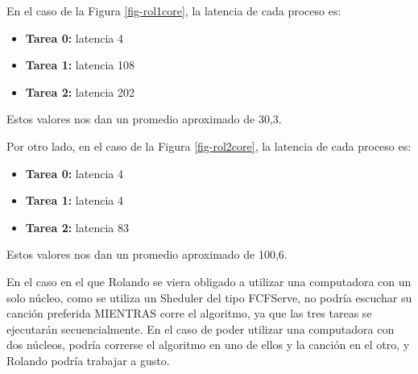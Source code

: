 En el caso de la Figura \ref{fig-rol1core}, la latencia de cada proceso es:

\begin{itemize}
	\item {\bf Tarea 0:} latencia 4
	\item {\bf Tarea 1:} latencia 108
	\item {\bf Tarea 2:} latencia 202
\end{itemize}

Estos valores nos dan un promedio aproximado de 30,3.
\vspace*{0.5cm}

Por otro lado, en el caso de la Figura \ref{fig-rol2core}, la latencia de cada proceso es:

\begin{itemize}
	\item {\bf Tarea 0:} latencia 4
	\item {\bf Tarea 1:} latencia 4
	\item {\bf Tarea 2:} latencia 83
\end{itemize}

Estos valores nos dan un promedio aproximado de 100,6.
\vspace*{0.5cm}

En el caso en el que Rolando se viera obligado a utilizar una computadora con un solo núcleo, como se utiliza un Sheduler del tipo FCFServe, no podría escuchar su canción preferida MIENTRAS corre el algoritmo, ya que las tres tareas se ejecutarán secuencialmente.  En el caso de poder utilizar una computadora con dos núcleos, podría correrse el algoritmo en uno de ellos y la canción en el otro, y Rolando podría trabajar a gusto.